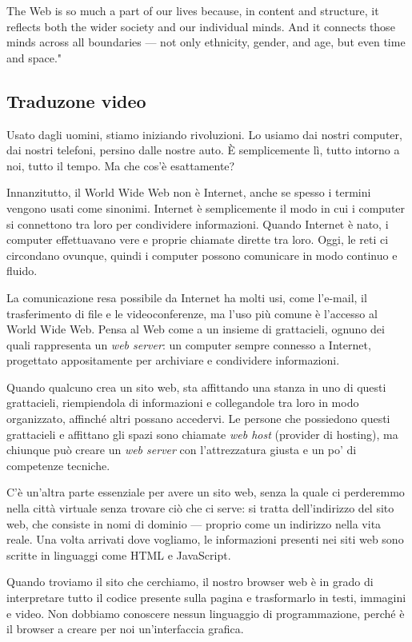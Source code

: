 The Web is so much a part of our lives because, in content and structure, it reflects both the wider society and our individual minds. And it connects those minds across all boundaries — not only ethnicity, gender, and age, but even time and space."


\subsection{Traduzone video}

Usato dagli uomini, stiamo iniziando rivoluzioni. Lo usiamo dai nostri computer, dai nostri telefoni, persino dalle nostre auto. È semplicemente lì, tutto intorno a noi, tutto il tempo. Ma che cos'è esattamente?

Innanzitutto, il World Wide Web non è Internet, anche se spesso i termini vengono usati come sinonimi. Internet è semplicemente il modo in cui i computer si connettono tra loro per condividere informazioni. Quando Internet è nato, i computer effettuavano vere e proprie chiamate dirette tra loro. Oggi, le reti ci circondano ovunque, quindi i computer possono comunicare in modo continuo e fluido.

La comunicazione resa possibile da Internet ha molti usi, come l’e-mail, il trasferimento di file e le videoconferenze, ma l’uso più comune è l’accesso al World Wide Web. Pensa al Web come a un insieme di grattacieli, ognuno dei quali rappresenta un \textit{web server}: un computer sempre connesso a Internet, progettato appositamente per archiviare e condividere informazioni.

Quando qualcuno crea un sito web, sta affittando una stanza in uno di questi grattacieli, riempiendola di informazioni e collegandole tra loro in modo organizzato, affinché altri possano accedervi. Le persone che possiedono questi grattacieli e affittano gli spazi sono chiamate \textit{web host} (provider di hosting), ma chiunque può creare un \textit{web server} con l’attrezzatura giusta e un po’ di competenze tecniche.

C'è un'altra parte essenziale per avere un sito web, senza la quale ci perderemmo nella città virtuale senza trovare ciò che ci serve: si tratta dell’indirizzo del sito web, che consiste in nomi di dominio — proprio come un indirizzo nella vita reale. Una volta arrivati dove vogliamo, le informazioni presenti nei siti web sono scritte in linguaggi come HTML e JavaScript.

Quando troviamo il sito che cerchiamo, il nostro browser web è in grado di interpretare tutto il codice presente sulla pagina e trasformarlo in testi, immagini e video. Non dobbiamo conoscere nessun linguaggio di programmazione, perché è il browser a creare per noi un'interfaccia grafica.

